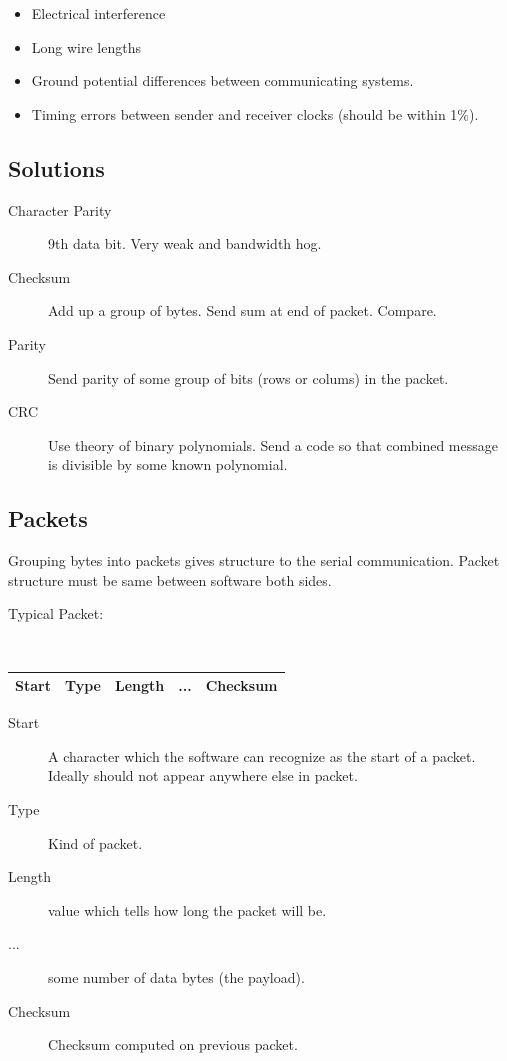 \documentclass{article}	%
\begin{document}
\begin{itemize}
        \item Electrical interference
        \item Long wire lengths
        \item Ground potential differences between
        communicating systems.
        \item Timing errors between sender and
        receiver clocks (should be within 1\%).
\end{itemize}


\subsection{Solutions}
\begin{description}
 \item[Character Parity] 9th data bit.
        Very weak and bandwidth hog.
 \item[Checksum]  Add up a group of bytes.
        Send sum at end of packet. Compare.
 \item[Parity] Send parity of some group of
        bits (rows or colums) in the packet.
 \item[CRC] Use theory of binary polynomials.
       Send a code so that combined message
       is divisible by some known polynomial.
\end{description}

\subsection{Packets}

Grouping bytes into packets gives structure
to the serial communication.   Packet structure
must be same between software both sides.

Typical Packet:


{\tt
\begin{tabular}{|c|c|c|c|c|}
\hline
Start &   Type & Length  & ... & Checksum  \\
\hline
\end{tabular}
}

\begin{description}
        \item[Start] A character which the software can recognize
        as the start of a packet.   Ideally should not appear anywhere
        else in packet.
        \item[Type] Kind of packet.
        \item[Length] value which tells how long the
        packet will be.
        \item[...] some number of data bytes (the payload).
        \item[Checksum] Checksum computed on previous packet.
\end{description}
\end{document}
